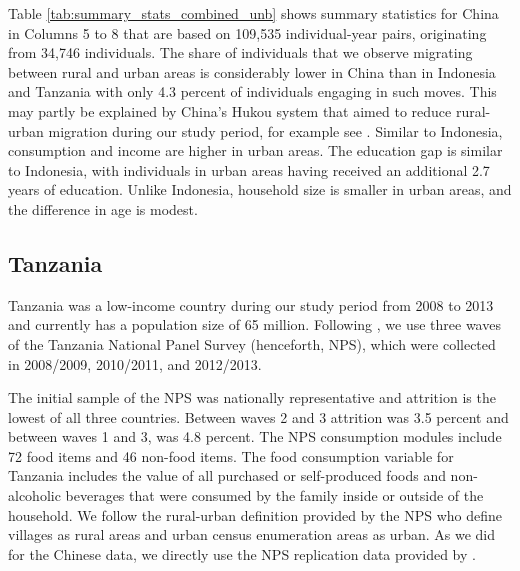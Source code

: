 \documentclass[12pt]{article}
\begin{document}

Table \ref{tab:summary_stats_combined_unb} shows summary statistics for China in Columns 5 to 8 that are based on 109,535 individual-year pairs, originating from 34,746 individuals. The share of individuals that we observe migrating between rural and urban areas is considerably lower in China than in Indonesia and Tanzania with only 4.3 percent of individuals engaging in such moves. This may partly be explained by China's Hukou system that aimed to reduce rural-urban migration during our study period, for example see \cite{khanna2021productivity}.
Similar to Indonesia, consumption and income are higher in urban areas. The education gap is similar to Indonesia, with individuals in urban areas having received an additional 2.7 years of education. Unlike Indonesia, household size is smaller in urban areas, and the difference in age is modest.


\subsection{Tanzania}\label{subsec:Tanzania-data}
Tanzania was a low-income country during our study period from 2008 to 2013 and currently has a population size of 65 million. Following \cite{lagakosMigrationCostsObservational2020}, we use three waves of the Tanzania National Panel Survey (henceforth, NPS), which were collected in 2008/2009, 2010/2011, and 2012/2013. 

The initial sample of the NPS was nationally representative and attrition is the lowest of all three countries.  Between waves 2 and 3 attrition was 3.5 percent and between waves 1 and 3, was 4.8 percent. The NPS consumption modules include 72 food items and 46 non-food items.
The food consumption variable for Tanzania includes the value of all purchased or self-produced foods and non-alcoholic beverages that were consumed by the family inside or outside of the household. 
We follow the rural-urban definition provided by the NPS who define villages as rural areas and urban census enumeration areas as urban.
As we did for the Chinese data, we directly use the NPS replication data provided by \cite{lagakosMigrationCostsObservational2020}.
\end{document}

